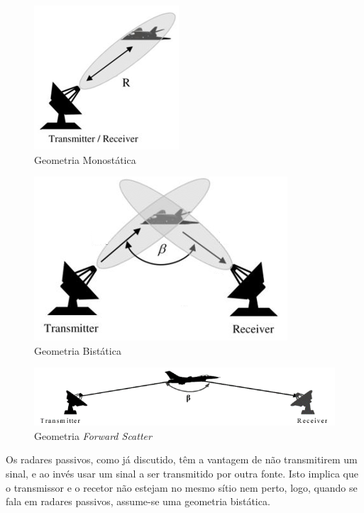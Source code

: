 \begin{figure}[h]
\centering
\includegraphics[scale=0.8]{chapters/ch2/assets/monostatic}
\caption[Geometria Monostática]{Geometria Monostática}
\label{fig:monostatic}
\end{figure}

\begin{figure}[h]
\centering
\includegraphics[scale=0.8]{chapters/ch2/assets/bistatic}
\caption[Geometria Bistática]{Geometria Bistática}
\label{fig:bistatic}
\end{figure}

\begin{figure}[h]
\centering
\includegraphics[scale=0.7]{chapters/ch2/assets/fsc}
\caption[Geometria \textit{Forward Scatter}]{Geometria \textit{Forward Scatter}}
\label{fig:fsc}
\end{figure}

Os radares passivos, como já discutido, têm a vantagem de não transmitirem um sinal, e ao invés usar um sinal a ser transmitido por outra fonte. Isto implica que o transmissor e o recetor não estejam no mesmo sítio nem perto, logo, quando se fala em radares passivos, assume-se uma geometria bistática.



